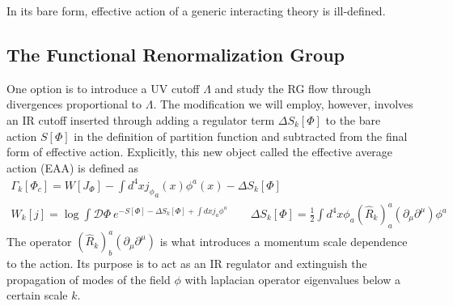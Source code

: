 \documentclass[11pt, a4paper]{article}
\newcommand{\jhk}[1]{{\color{red}#1}}
\begin{document}
In its bare form, effective action of a generic interacting theory is ill-defined. 
\jhk{
\subsection{The Functional Renormalization Group}}
 One option is to introduce a UV cutoff $\Lambda$
and study the RG flow through divergences proportional to $\Lambda$. The modification we will employ, however, involves
an IR cutoff inserted through adding a regulator term $\Delta S_k[\Phi]$ to the bare action $S[\Phi]$ in the definition of partition function
and subtracted from the final form of effective action. Explicitly, this new object called the effective average action (EAA) is defined as
\begin{gather}
    \Gamma_k[\Phi_c] = W[J_\Phi] - \int d^4 x {j_\phi}_a(x) \phi^a(x) - \Delta S_k[\Phi]\\
    W_k[j] = \log{\int \mathcal{D}\Phi \ e^{-S[\Phi] - \Delta S_k[\Phi] + \int dx j_a \phi^a}} \qquad \Delta S_k[\Phi] = \frac{1}{2}\int d^4 x \phi_a (\hat{R}_k)^a_a (\partial_{\mu}\partial^{\mu}) \phi^a
\end{gather}
The operator $(\hat{R}_k)^a_b (\partial_{\mu}\partial^{\mu})$ is what introduces a momentum scale dependence to the action.
Its purpose is to act as an IR regulator and extinguish the propagation of modes of the field $\phi$ with laplacian operator eigenvalues below a certain scale $k$.

\end{document}
